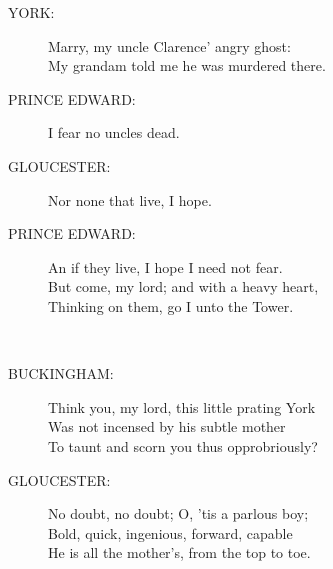 \documentclass{article}
\begin{document}
\begin{description}
\item[YORK:] 
\hspace{1pt}Marry, my uncle Clarence' angry ghost:\\
\hspace{1pt}My grandam told me he was murdered there.\\
\end{description}
\begin{description}
\item[PRINCE EDWARD:] 
\hspace{1pt}I fear no uncles dead.\\
\end{description}
\begin{description}
\item[GLOUCESTER:] 
\hspace{1pt}Nor none that live, I hope.\\
\end{description}
\begin{description}
\item[PRINCE EDWARD:] 
\hspace{1pt}An if they live, I hope I need not fear.\\
\hspace{1pt}But come, my lord; and with a heavy heart,\\
\hspace{1pt}Thinking on them, go I unto the Tower.\\
\end{description}
\\
\begin{description}
\item[BUCKINGHAM:] 
\hspace{1pt}Think you, my lord, this little prating York\\
\hspace{1pt}Was not incensed by his subtle mother\\
\hspace{1pt}To taunt and scorn you thus opprobriously?\\
\end{description}
\begin{description}
\item[GLOUCESTER:] 
\hspace{1pt}No doubt, no doubt; O, 'tis a parlous boy;\\
\hspace{1pt}Bold, quick, ingenious, forward, capable\\
\hspace{1pt}He is all the mother's, from the top to toe.\\
\end{description}
\end{document}
